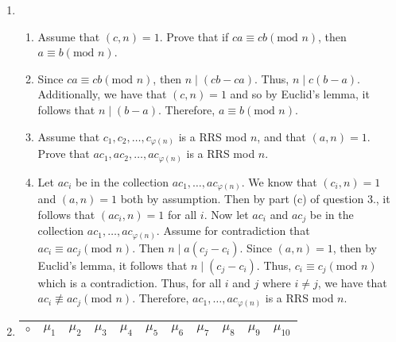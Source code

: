 \documentclass[12pt]{article}
\makeatletter
\theoremstyle{definition}
\theoremstyle{remark}
\renewenvironment{proof}[1][\proofname]{\par
  \pushQED{\qed}%
  \normalfont \topsep6\p@\@plus6\p@\relax
  \list{}{\leftmargin=0mm
          \rightmargin=4mm
          \settowidth{\itemindent}{\itshape#1}%
          \labelwidth=\itemindent
          \parsep=0pt \listparindent=\parindent 
  }
  \item[\hskip\labelsep
        \itshape
    #1\@addpunct{.}]\ignorespaces
}{%
  \popQED\endlist\@endpefalse
}
\let\oldproofname=\proofname
\renewcommand{\proofname}{\bf{\textit{\oldproofname}}}
\makeatother
\begin{document}
\begin{enumerate}[leftmargin=*]
    \item\par\hfill
        \begin{enumerate}[label=(\alph*)]
        
        \item Assume that $(c,n)=1$. Prove that if $ca\equiv cb(\text{mod }n)$, then $a\equiv b(\text{mod }n)$.
        
        \begin{proof}
            Since $ca\equiv cb(\text{mod }n)$, then $n\mid(cb-ca)$. Thus, $n\mid c(b-a)$. Additionally, we have that $(c,n)=1$ and so by Euclid's lemma, it follows that $n\mid(b-a)$. Therefore, $a\equiv b(\text{mod }n)$.
        \end{proof}
        
        \item Assume that $c_1, c_2, \dots, c_{\varphi(n)}$ is a RRS mod $n$, and that $(a,n)=1$. Prove that $ac_1,ac_2,\dots,ac_{\varphi(n)}$ is a RRS mod $n$.
        
        \begin{proof}
            Let $ac_i$ be in the collection $ac_1,\dots,ac_{\varphi(n)}$. We know that $(c_i,n)=1$ and $(a,n)=1$ both by assumption. Then by part (c) of question 3., it follows that $(ac_i,n)=1$ for all $i$. Now let $ac_i$ and $ac_j$ be in the collection $ac_1,\dots,ac_{\varphi(n)}$. Assume for contradiction that $ac_i\equiv ac_j(\text{mod }n)$. Then $n\mid a(c_j-c_i)$. Since $(a,n)=1$, then by Euclid's lemma, it follows that $n\mid(c_j-c_i)$. Thus, $c_i\equiv c_j(\text{mod }n)$ which is a contradiction. Thus, for all $i$ and $j$ where $i\neq j$, we have that $ac_i\not\equiv ac_j(\text{mod }n)$. Therefore, $ac_1,\dots,ac_{\varphi(n)}$ is a RRS mod $n$. 
        \end{proof}
        
        \end{enumerate}
        
    \newpage
        
    \item 
    
    \begin{table}[htb]
    \centering
    \begin{tabular}{c|cccccccccc}
    
    $\circ$ & $\mu_1$ & $\mu_2$ & $\mu_3$ & $\mu_4$ & $\mu_5$ & $\mu_6$ & $\mu_7$ & $\mu_8$ & $\mu_9$ & $\mu_{10}$ \\
    
    \hline
    

\end{tabular}
\end{table}
\end{enumerate}
\end{document}
